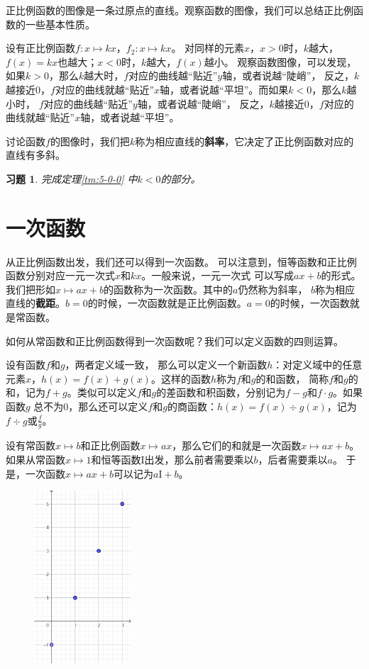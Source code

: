 \documentclass[12pt,UTF8]{ctexbook}
\newtheorem{xt}{习题}[section]
\begin{document}
正比例函数的图像是一条过原点的直线。观察函数的图像，我们可以总结正比例函数的一些基本性质。

设有正比例函数$f: x\mapsto kx$，$f_2: x\mapsto kx$。
对同样的元素$x$，$x>0$时，$k$越大，$f(x) = kx$也越大；$x<0$时，$k$越大，$f(x)$越小。
观察函数图像，可以发现，如果$k>0$，那么$k$越大时，$f$对应的曲线越“贴近”$y$轴，或者说越“陡峭”，
反之，$k$越接近$0$，$f$对应的曲线就越“贴近”$x$轴，或者说越“平坦”。而如果$k<0$，那么$k$越小时，
$f$对应的曲线越“贴近”$y$轴，或者说越“陡峭”，
反之，$k$越接近$0$，$f$对应的曲线就越“贴近”$x$轴，或者说越“平坦”。

讨论函数$f$的图像时，我们把$k$称为相应直线的\textbf{斜率}，它决定了正比例函数对应的直线有多斜。

\begin{xt}\label{xt:5-0-0}
    完成定理\ref{tm:5-0-0} 中$k<0$的部分。
\end{xt}

\section{一次函数}
从正比例函数出发，我们还可以得到一次函数。
可以注意到，恒等函数和正比例函数分别对应一元一次式$x$和$kx$。一般来说，一元一次式
可以写成$ax+b$的形式。我们把形如$x \mapsto ax + b$的函数称为一次函数。其中的$a$仍然称为斜率，
$b$称为相应直线的\textbf{截距}。$b=0$的时候，一次函数就是正比例函数。$a=0$的时候，一次函数就是常函数。

如何从常函数和正比例函数得到一次函数呢？我们可以定义函数的四则运算。

设有函数$f$和$g$，两者定义域一致，
那么可以定义一个新函数$h$：对定义域中的任意元素$x$，$h(x) = f(x) + g(x)$。这样的函数$h$称为$f$和$g$的和函数，
简称$f$和$g$的和，记为$f + g$。类似可以定义$f$和$g$的差函数和积函数，分别记为$f - g$和$f\cdot g$。如果函数$g$
总不为$0$，那么还可以定义$f$和$g$的商函数：$h(x) = f(x) \div g(x)$，记为$f \div g$或$\frac{f}{g}$。

设有常函数$x\mapsto b$和正比例函数$x\mapsto ax$，那么它们的和就是一次函数$x\mapsto ax + b$。
如果从常函数$x\mapsto 1$和恒等函数$\mathrm{I}$出发，那么前者需要乘以$b$，后者需要乘以$a$。
于是，一次函数$x \mapsto ax + b$可以记为$a\mathrm{I} +b$。

\begin{figure} %
    \vspace{-10pt}
    \flushright
    \includegraphics[width=0.32\textwidth]{一次函数1.png}
\end{figure}
\end{document}
